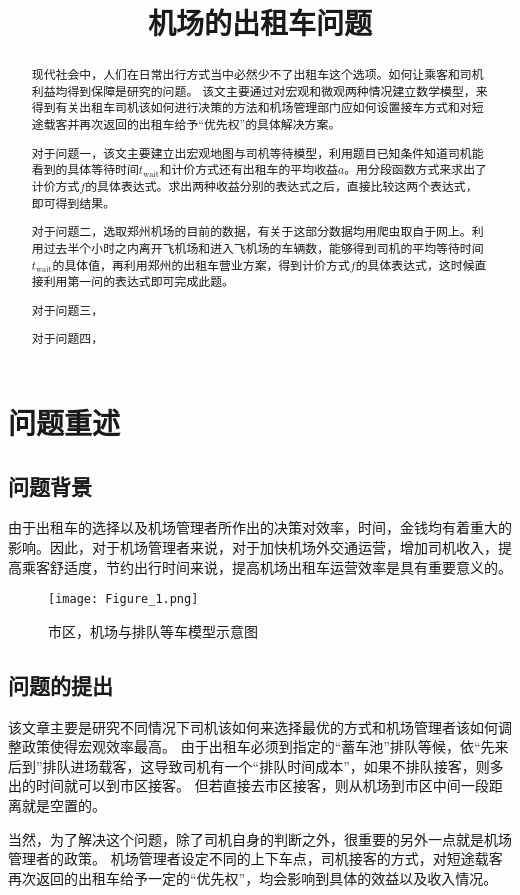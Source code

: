 \documentclass[withoutpreface,bwprint]{cumcmthesis} %
\title{机场的出租车问题}
\begin{document}
\maketitle
\begin{abstract}
	现代社会中，人们在日常出行方式当中必然少不了出租车这个选项。如何让乘客和司机利益均得到保障是研究的问题。
	该文主要通过对宏观和微观两种情况建立数学模型，来得到有关出租车司机该如何进行决策的方法和机场管理部门应如何设置接车方式和对短途载客并再次返回的出租车给予“优先权”的具体解决方案。
	\par
	对于问题一，该文主要建立出宏观地图与司机等待模型，利用题目已知条件知道司机能看到的具体等待时间$t_{ \mathrm{wait}}$和计价方式还有出租车的平均收益$a$。用分段函数方式来求出了计价方式$f$的具体表达式。求出两种收益分别的表达式之后，直接比较这两个表达式，即可得到结果。
	\par
	对于问题二，选取郑州机场的目前的数据，有关于这部分数据均用爬虫取自于网上。利用过去半个小时之内离开飞机场和进入飞机场的车辆数，能够得到司机的平均等待时间$t_{ \mathrm{wait}}$的具体值，再利用郑州的出租车营业方案，得到计价方式$f$的具体表达式，这时候直接利用第一问的表达式即可完成此题。
	\par
	对于问题三，
	\par
	对于问题四，
	\par
\end{abstract}

\tableofcontents
\newpage
\section{问题重述}
\subsection{问题背景}
由于出租车的选择以及机场管理者所作出的决策对效率，时间，金钱均有着重大的影响。因此，对于机场管理者来说，对于加快机场外交通运营，增加司机收入，提高乘客舒适度，节约出行时间来说，提高机场出租车运营效率是具有重要意义的。
\begin{figure}[!h]
	\centering
	\texttt{[image: Figure\_1.png]}
	\caption{市区，机场与排队等车模型示意图}
\end{figure}

\subsection{问题的提出}
该文章主要是研究不同情况下司机该如何来选择最优的方式和机场管理者该如何调整政策使得宏观效率最高。
由于出租车必须到指定的“蓄车池”排队等候，依“先来后到”排队进场载客，这导致司机有一个“排队时间成本”，如果不排队接客，则多出的时间就可以到市区接客。
但若直接去市区接客，则从机场到市区中间一段距离就是空置的。
\par
当然，为了解决这个问题，除了司机自身的判断之外，很重要的另外一点就是机场管理者的政策。
机场管理者设定不同的上下车点，司机接客的方式，对短途载客再次返回的出租车给予一定的“优先权”，均会影响到具体的效益以及收入情况。
\end{document}

